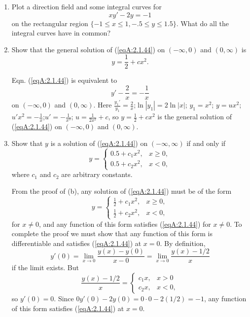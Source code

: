 \documentclass{ximera}
\begin{document}
\begin{problem}\label{exer:2.1.44}
\begin{enumerate}
\item %
Plot a direction field and some integral curves for
\begin{equation}\label{eqA:2.1.44}
    xy'-2y=-1
\end{equation}
on the rectangular region  $\{-1\leq x\leq 1, -.5\leq y\leq 1.5\}$.
What do all the integral curves have in common?

\item \label{part2.1.44b}%
Show that the general solution of (\ref{eqA:2.1.44})
on $(-\infty,0)$ and $(0,\infty)$ is
$$
y=\frac{1}{2}+cx^2.
$$



\begin{solution}
    Eqn. (\ref{eqA:2.1.44}) is equivalent to
$$
y'-\frac{2}{ x}=-\frac{1}{ x}
$$
on $(-\infty,0)$ and $(0,\infty)$. Here
$\frac{y_1'}{ y_1}=\frac{2}{ x}$;\quad $\ln|y_1|=2\ln|x|$;\quad
$y_1=x^2$;\quad
$y=ux^2$;\quad $u'x^2=-\frac{1}{ x}$;\quad $u'=-\frac{1}{
x^3}$;\quad
$u=\frac{1}{2x^2}+c$, so $y=\frac{1}{2}+cx^2$ is the general
solution of (\ref{eqA:2.1.44}) on $(-\infty,0)$ and $(0,\infty)$.
\end{solution}

\item %
Show that $y$ is a solution of (\ref{eqA:2.1.44}) on
$(-\infty,\infty)$ if and only if
$$
y=\left\{\begin{array}{ll}0.5+c_1x^2, &x
\ge 0,\\
0.5+c_2x^2, &x < 0,\end{array}\right.
$$
 where $c_1$ and $c_2$ are arbitrary constants.

 

 \begin{solution}
     From the proof of (b), any solution of (\ref{eqA:2.1.44}) must be of the form
$$
y=\left\{\begin{array}{ll}\frac{1}{2}+c_1x^2, &x
\ge 0,\\
\frac{1}{2}+c_2x^2, &x < 0,\end{array}\right.
$$
for $x\ne0$, and any function of this form
satisfies (\ref{eqA:2.1.44}) for $x\ne0$. To complete the proof we
must show that any function of this form is
differentiable and satisfies (\ref{eqA:2.1.44}) at $x=0$. By
definition,
$$
y'(0)=\lim_{x\to0}\frac{y(x)-y(0)}{ x-0}=\lim_{x\to0}\frac{y(x)-1/2}{
x}
$$
if the limit exists. But
$$
\frac{y(x)-1/2}{ x}=\left\{\begin{array}{cl} c_1x,&x>0\\
c_2x,&x<0,\end{array}\right.
$$
so $y'(0)=0$. Since $0y'(0)-2y(0)=0\cdot0-2(1/2)=-1$, any function of
this form satisfies (\ref{eqA:2.1.44}) at
$x=0$.
 \end{solution}


\end{enumerate}
\end{problem}
\end{document}
